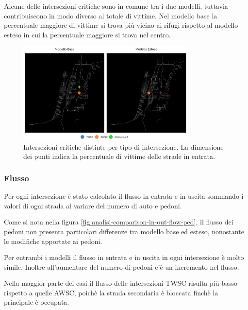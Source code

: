 Alcune delle intersezioni critiche sono in comune tra i due modelli, tuttavia contribuiscono in modo diverso al totale di vittime.
Nel modello base la percentuale maggiore di vittime si trova più vicino ai rifugi rispetto al modello esteso in cui la percentuale maggiore si trova nel centro.

\begin{figure}[ht]
    \centering
    \includegraphics[width=0.8\textwidth]{images/analisi/critical_ints_map.png}
    \caption{Intersezioni critiche distinte per tipo di intersezione. La dimensione dei punti indica la percentuale di vittime delle strade in entrata.}
    \label{fig:analisi-comparison-critical-ints2}
\end{figure}


\subsubsection*{Flusso}
Per ogni intersezione è stato calcolato il flusso in entrata e in uscita sommando i valori di ogni strada al variare del numero di auto e pedoni.

Come si nota nella figura \ref{fig:analisi-comparison-in-out-flow-ped}, 
il flusso dei pedoni non presenta particolari differenze tra modello base ed esteso, nonostante le modifiche apportate ai pedoni.

Per entrambi i modelli il flusso in entrata e in uscita in ogni intersezione è molto simile.
Inoltre all'aumentare del numero di pedoni c'è un incremento nel flusso.

Nella maggior parte dei casi il flusso delle intersezioni TWSC risulta più basso rispetto a quelle AWSC, poichè la strada secondaria 
è bloccata finchè la principale è occupata.

